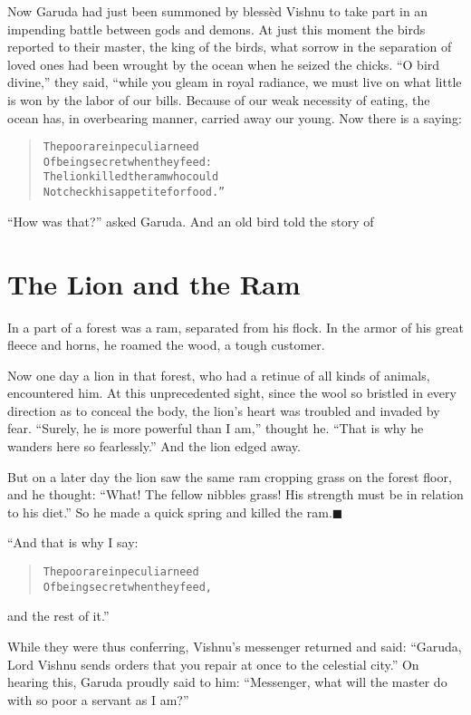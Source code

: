 \documentclass[article, twoside, 14pt]{memoir}
\newcommand{\qed}{\hfill \ensuremath{\blacksquare}}
\renewenvironment{verbatim}{%
\begin{quote}%
\vskip -10pt%
\begin{alltt}\normalfont\large}{\end{alltt}%
\end{quote}%
\vskip -10pt
} %
\begin{document}
Now Garuda had just been summoned by blessèd Vishnu to take part in
an impending battle between gods and demons. At just this moment
the birds reported to their master, the king of the birds,
what sorrow in the separation of loved ones had been wrought by the
ocean when he seized the chicks. ``O bird divine,'' they said,
“while you gleam in royal radiance, we must live on what little is
won by the labor of our bills. Because of our weak necessity of
eating, the ocean has, in overbearing manner, carried away our
young. Now there is a saying:

\begin{verbatim}
The poor are in peculiar need
Of being secret when they feed:
The lion killed the ram who could
Not check his appetite for food.”
\end{verbatim}
``How was that?'' asked Garuda. And an old bird told the story of

\chapter{The Lion and the Ram}

\label{s23}

In a part of a forest was a ram, separated from his flock. In the
armor of his great fleece and horns, he roamed the wood, a tough
customer.

Now one day a lion in that forest, who had a retinue of all kinds
of animals, encountered him. At this unprecedented sight, since the
wool so bristled in every direction as to conceal the body, the
lion's heart was troubled and invaded by fear.
``Surely, he is more powerful than I am,'' thought he.
``That is why he wanders here so fearlessly.'' And the lion edged
away.

But on a later day the lion saw the same ram cropping grass on the
forest floor, and he thought:
``What! The fellow nibbles grass! His strength must be in relation to his diet.''
So he made a quick spring and killed the ram.\hyperref[s23]{\qed}

“And that is why I say:

\begin{verbatim}
The poor are in peculiar need
Of being secret when they feed,
\end{verbatim}
and the rest of it.”

While they were thus conferring, Vishnu's messenger returned and
said:
``Garuda, Lord Vishnu sends orders that you repair at once to the celestial city.''
On hearing this, Garuda proudly said to him:
``Messenger, what will the master do with so poor a servant as I am?''
\end{document}
